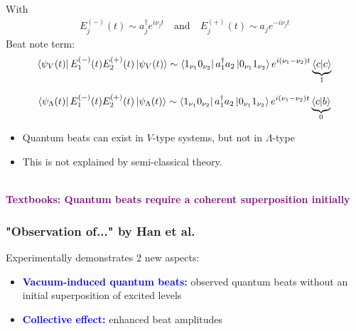 \documentclass{beamer}
\theoremstyle{definition}
\begin{document}
\begin{frame}
With
\begin{align*}
E^{(-)}_j(t) \sim a_j^\dagger e^{i\nu_j t} \quad \text{and} \quad E^{(+)}_j(t) \sim a_j e^{-i\nu_j t} 
\end{align*}
Beat note term:
\begin{equation*}
\bra{\psi_V(t)} E_1^{(-)}(t) E_2^{(+)}(t)  \ket{\psi_V(t)} \sim \bra{1_{\nu_1} 0_{\nu_2}} a_1^\dagger a_2 \ket{0_{\nu_1} 1_{\nu_2}} e^{i(\nu_1 - \nu_2)t} \underbrace{\braket{c}}_{1}
\end{equation*}

\begin{equation*}
\bra{\psi_\Lambda(t)} E_1^{(-)}(t) E_2^{(+)}(t)  \ket{\psi_\Lambda(t)} \sim \bra{1_{\nu_1} 0_{\nu_2}} a_1^\dagger a_2 \ket{0_{\nu_1} 1_{\nu_2}} e^{i(\nu_1 - \nu_2)t} \underbrace{\bra{c}\ket{b}}_{0}
\end{equation*}



\begin{itemize}
	\item Quantum beats can exist in $V$-type systems, but not in $\Lambda$-type
	
	
	\item This is not explained by semi-classical theory.
\end{itemize}

$\,$\\


\textcolor{purple}{\textbf{Textbooks: Quantum beats require a coherent superposition initially}}


\end{frame}



\begin{frame}
	\frametitle{"Observation of..." by Han et al.}
	
	Experimentally demonstrates 2 new aspects:
	\begin{itemize}
		\item \textbf{\textcolor{blue}{Vacuum-induced quantum beats:}} observed quantum beats without an initial superposition of excited levels
		
		
		\item \textbf{\textcolor{blue}{Collective effect:}} enhanced beat amplitudes 
	\end{itemize}
	
	
	
	
	
	
\end{frame}
\end{document}

